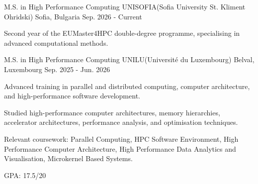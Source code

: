 

\begin{cventries}

  \cventry
  {M.S. in High Performance Computing} %
  {UNISOFIA(Sofia University St. Kliment Ohridski)} %
  {Sofia, Bulgaria} %
  {Sep. 2026 - Current} %
  {
    \begin{cvitems} %
      \item {Second year of the EUMaster4HPC double-degree programme, specialising in advanced computational methods.}
      \end{cvitems}
    }

    \cventry
    {M.S. in High Performance Computing} %
    {UNILU(Université du Luxembourg)} %
    {Belval, Luxembourg} %
    {Sep. 2025 - Jun. 2026} %
    {
      \begin{cvitems} %
      \item {Advanced training in parallel and distributed computing, computer architecture, and high-performance software development.}
      \item {Studied high-performance computer architectures, memory hierarchies, accelerator architectures, performance analysis, and optimisation techniques.}
      \item {Relevant coursework: Parallel Computing, HPC Software Environment, High Performance Computer Architecture, High Performance Data Analytics and Visualisation, Microkernel Based Systems.}
      \item {GPA: 17.5/20}
      \end{cvitems}
    }


\end{cventries}
